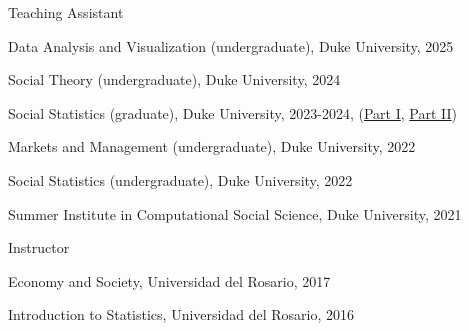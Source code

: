 \documentclass[11pt,article,oneside]{memoir}
\begin{document}
\bigskip


\bigskip

\ind Teaching Assistant

\ind \hspace{0.35in} \footnotesize \textemdash Data Analysis and Visualization (undergraduate), Duke University, 2025

\ind \hspace{0.35in} \footnotesize \textemdash Social Theory (undergraduate), Duke University, 2024

\ind \hspace{0.35in} \textemdash Social Statistics (graduate), Duke University, 2023-2024, (\href{https://acastroaraujo.github.io/socStats/}{Part I}, \href{https://acastroaraujo.github.io/socStats2/}{Part II})

\ind \hspace{0.35in} \textemdash Markets and Management (undergraduate), Duke University, 2022

\ind \hspace{0.35in} \textemdash Social Statistics (undergraduate), Duke University, 2022

\ind \hspace{0.35in} \textemdash Summer Institute in Computational Social Science, Duke University, 2021

\normalsize \ind Instructor 

\footnotesize

\ind \hspace{0.35in} \textemdash Economy and Society, Universidad del Rosario, 2017

\ind \hspace{0.35in} \textemdash Introduction to Statistics, Universidad del Rosario, 2016

\normalsize

\bigskip


\medskip
\end{document}
